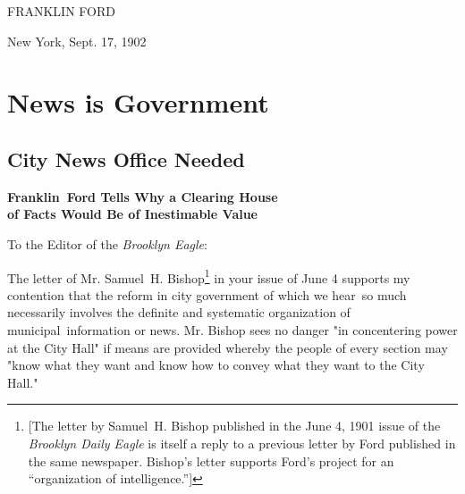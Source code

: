 \documentclass[twoside,symmetric,nobib,justified]{tufte-book}
\let\oldchapter\chapter
\def\chapter{%
  \setcounter{footnote}{0}%
  \oldchapter
}
\begin{document}
\vspace{0.15in}

\hfill{\Large FRANKLIN FORD}

\vspace{0.1in}

{\large New York, Sept. 17, 1902}



\part{News is Government}

\restoregeometry


\chapter[City News Office Needed]{City News Office Needed}
\label{ch:City News Office Needed!}

\vspace{.2in}

\begin{LARGE}


\end{LARGE}

\vspace{0.5in}

\begin{center}

\begin{spacing}{1.25}


    
{\LARGE\bfseries Franklin~Ford Tells Why a Clearing House\\of Facts Would Be
of Inestimable
Value}

\end{spacing}

\end{center}

\vspace{0.15in}

\noindent To the Editor of the \emph{Brooklyn Eagle}:~~

\vspace{0.05in}

The letter of Mr. Samuel~H. Bishop\footnote{{[}The letter by Samuel~H.
  Bishop published in the June 4, 1901 issue of the \emph{Brooklyn Daily
  Eagle} is itself a reply to a previous letter by Ford published in the
  same newspaper. Bishop's letter supports Ford's project for an
  ``organization of intelligence.''{]}} in your issue of June 4 supports
my contention that the reform in city government of which we hear~so
much necessarily involves the definite and systematic organization of
municipal~information or news. Mr. Bishop sees no danger "in
concentering power at the City Hall" if means are provided whereby the
people of every section may "know what they want and know how to convey
what they want to the City Hall."~
\end{document}
